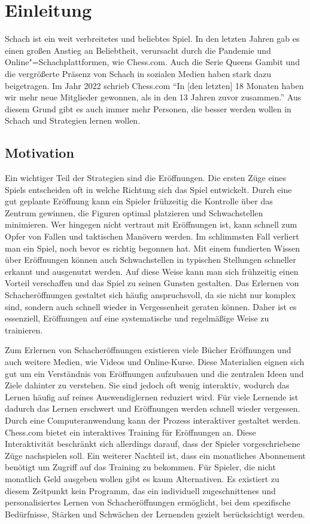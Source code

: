 
\chapter{Einleitung}

Schach ist ein weit verbreitetes und beliebtes Spiel. In den letzten Jahren gab es einen großen Anstieg an Beliebtheit, verursacht durch die Pandemie und Online"=Schachplattformen, wie Chess.com. Auch die Serie Queens Gambit und die vergrößerte Präsenz von Schach in sozialen Medien haben stark dazu beigetragen. Im Jahr 2022 schrieb Chess.com\: \enquote{In [den letzten] 18 Monaten haben wir mehr neue Mitglieder gewonnen, als in den 13 Jahren zuvor zusammen.} \cite{chesscom_chesscom_2022} Aus diesem Grund gibt es auch immer mehr Personen, die besser werden wollen in Schach und Strategien lernen wollen.

\section{Motivation}
Ein wichtiger Teil der Strategien sind die Eröffnungen. Die ersten Züge eines Spiels entscheiden oft in welche Richtung sich das Spiel entwickelt. Durch eine gut geplante Eröffnung kann ein Spieler frühzeitig die Kontrolle über das Zentrum gewinnen, die Figuren optimal platzieren und Schwachstellen minimieren. Wer hingegen nicht vertraut mit Eröffnungen ist, kann schnell zum Opfer von Fallen und taktischen Manövern werden. Im schlimmsten Fall verliert man ein Spiel, noch bevor es richtig begonnen hat. Mit einem fundierten Wissen über Eröffnungen können auch Schwachstellen in typischen Stellungen schneller erkannt und ausgenutzt werden. Auf diese Weise kann man sich frühzeitig einen Vorteil verschaffen und das Spiel zu seinen Gunsten gestalten. Das Erlernen von Schacheröffnungen gestaltet sich häufig anspruchsvoll, da sie nicht nur komplex sind, sondern auch schnell wieder in Vergessenheit geraten können. Daher ist es essenziell, Eröffnungen auf eine systematische und regelmäßige Weise zu trainieren.

Zum Erlernen von Schacheröffnungen existieren viele Bücher Eröffnungen und auch weitere Medien, wie Videos und Online-Kurse. Diese Materialien eignen sich gut um ein Verständnis von Eröffnungen aufzubauen und die zentralen Ideen und Ziele dahinter zu verstehen.
Sie sind jedoch oft wenig interaktiv, wodurch das Lernen häufig auf reines Auswendiglernen reduziert wird. Für viele Lernende ist dadurch das Lernen erschwert  und Eröffnungen werden schnell wieder vergessen. Durch eine Computeranwendung kann der Prozess interaktiver gestaltet werden. Chess.com bietet ein interaktives Training für Eröffnungen an. Diese Interaktivität beschränkt sich allerdings darauf, dass der Spieler vorgeschriebene Züge nachspielen soll. Ein weiterer Nachteil ist, dass ein monatliches Abonnement benötigt um Zugriff auf das Training zu bekommen. Für Spieler, die nicht monatlich Geld ausgeben wollen gibt es kaum Alternativen.
Es existiert zu diesem Zeitpunkt kein Programm, das ein individuell zugeschnittenes und personalisiertes Lernen von Schacheröffnungen ermöglicht, bei dem spezifische Bedürfnisse, Stärken und Schwächen der Lernenden gezielt berücksichtigt werden.

